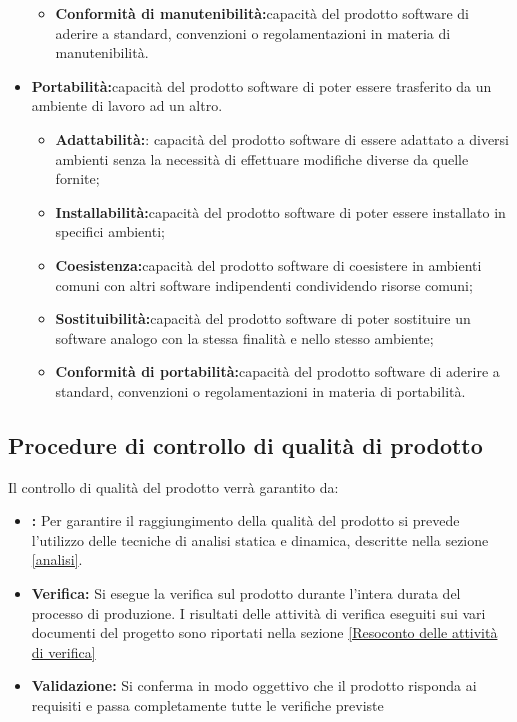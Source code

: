 \documentclass[12pt,a4paper]{article}
\begin{document}
\begin{itemize}
\begin{itemize}
\item\textbf{Conformità di manutenibilità:}capacità del prodotto software di aderire a standard, convenzioni o regolamentazioni in materia di manutenibilità.

\end{itemize}
\item\textbf{Portabilità:}capacità del prodotto software di poter essere trasferito da un ambiente di lavoro ad un altro.

\begin{itemize}
\item\textbf{Adattabilità:}: capacità del prodotto software di essere adattato a diversi ambienti senza la necessità di effettuare modifiche diverse da quelle fornite;
\item\textbf{Installabilità:}capacità del prodotto software di poter essere installato in specifici ambienti;

\item\textbf{Coesistenza:}capacità del prodotto software di coesistere in ambienti comuni con altri software indipendenti condividendo risorse comuni;

\item\textbf{Sostituibilità:}capacità del prodotto software di poter sostituire un software analogo con la stessa finalità e nello stesso ambiente;
\item\textbf{Conformità di portabilità:}capacità del prodotto software di aderire a standard, convenzioni o regolamentazioni in materia di portabilità.
\end{itemize}
\end{itemize}

\subsection{Procedure di controllo di qualità di prodotto}\label{sec:procedure-di-controllo-di-qualità-di-prodotto}
Il controllo di qualità del prodotto verrà garantito da:
\begin{itemize}
	\item \textbf{:} Per garantire il raggiungimento della qualità del prodotto si prevede l'utilizzo delle tecniche di analisi statica e dinamica, descritte nella sezione \ref{analisi}.
	\item \textbf{Verifica:} Si esegue la verifica sul prodotto durante l'intera durata del processo di produzione. I risultati delle attività di verifica eseguiti sui vari documenti del progetto sono riportati nella sezione \ref{Resoconto delle attività di verifica}
	\item \textbf{Validazione:} Si conferma in modo oggettivo che il prodotto risponda ai requisiti e passa completamente tutte le verifiche previste
\end{itemize}
\end{document}
